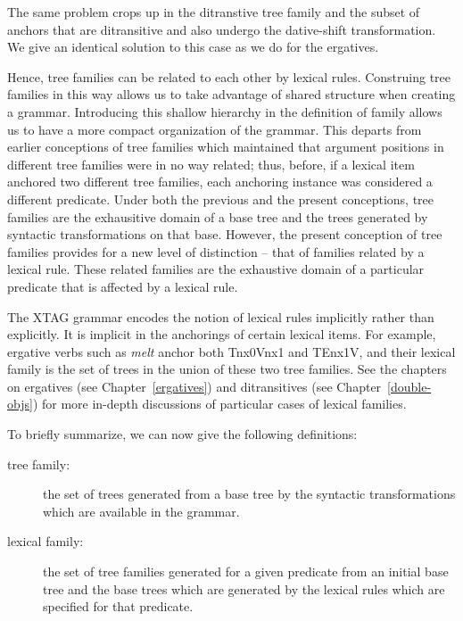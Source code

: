 The same problem crops up in the ditranstive tree family and the
subset of anchors that are ditransitive and also undergo the
dative-shift transformation. We give an identical solution to this
case as we do for the ergatives.

Hence, tree families can be related to each other by lexical rules.
Construing tree families in this way allows us to take advantage of
shared structure when creating a grammar. Introducing this shallow
hierarchy in the definition of family allows us to have a more compact
organization of the grammar. This departs from earlier conceptions of
tree families which maintained that argument positions in different
tree families were in no way related; thus, before, if a lexical item
anchored two different tree families, each anchoring instance was
considered a different predicate.  Under both the previous and the
present conceptions, tree families are the exhausitive domain of a
base tree and the trees generated by syntactic transformations on that
base.  However, the present conception of tree families provides for a
new level of distinction -- that of families related by a lexical
rule. These related families are the exhaustive domain of a particular
predicate that is affected by a lexical rule.

The XTAG grammar encodes the notion of lexical rules implicitly rather
than explicitly. It is implicit in the anchorings of certain lexical
items.  For example, ergative verbs such as {\it melt} anchor both
Tnx0Vnx1 and TEnx1V, and their lexical family is the set of trees in
the union of these two tree families.  See the chapters on ergatives
(see Chapter~\ref{ergatives}) and ditransitives (see
Chapter~\ref{double-objs}) for more in-depth discussions of particular
cases of lexical families.

To briefly summarize, we can now give the following definitions:

\begin{description}
\item[tree family:] the set of trees generated from a base tree by the
syntactic transformations which are available in the grammar.

\item[lexical family:] the set of tree families generated for a given
predicate from an initial base tree and the base trees which are
generated by the lexical rules which are specified for that predicate.

\end{description}
